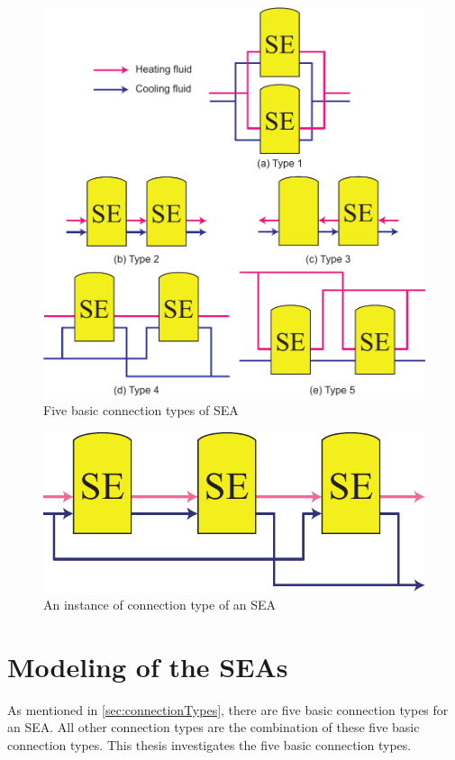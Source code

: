 \begin{figure}[htbp]
\centering
	\includegraphics[width = 0.7\columnwidth]{fig/BasicSEA}
	\caption{Five basic connection types of SEA}
	\label{fig:SEA}
\end{figure}

\begin{figure}[htbp]
\centering
	\includegraphics[width = 0.5\columnwidth]{fig/SEA_eg}
	\caption{An instance of connection type of an SEA}
	\label{fig:SEA_eg}
\end{figure}

\section{Modeling of the SEAs}

As mentioned in \autoref{sec:connectionTypes}, there are five basic connection types for an SEA. All other connection types are the combination of these five basic connection types. This thesis investigates the five basic connection types.

